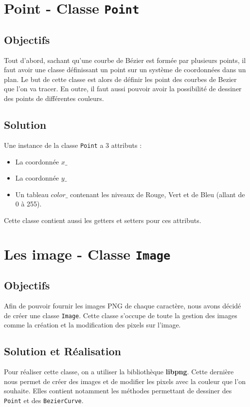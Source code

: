 \documentclass[a4paper, 12pt]{article}
\begin{document}
\newpage
\section{Point - Classe \texttt{Point}}	
\subsection{Objectifs}
	Tout d'abord, sachant qu'une courbe de Bézier est formée par plusieurs points, il faut avoir une classe définissant un point sur un système de coordonnées dans un plan. Le but de cette classe est alors de définir les point des courbes de Bezier que l'on va tracer. En outre, il faut aussi pouvoir avoir la possibilité de dessiner des points de différentes couleurs.
	
\subsection{Solution}
Une instance de la classe \texttt{Point} a 3 attributs : 
\begin{itemize}
\item La coordonnée $x\_$
\item La coordonnée $y\_$
\item Un tableau $color\_$ contenant les niveaux de Rouge, Vert et de Bleu (allant de 0 à 255). 
\end{itemize}
Cette classe contient aussi les getters et setters pour ces attributs.

\section{Les image - Classe \texttt{Image}}	
\subsection{Objectifs}
Afin de pouvoir fournir les images PNG de chaque caractère, nous avons décidé de créer une classe \texttt{Image}. Cette classe s'occupe de toute la gestion des images comme la création et la modification des pixels sur l'image.

\subsection{Solution et Réalisation}
Pour réaliser cette classe, on a utiliser la bibliothèque \textbf{libpng}. Cette dernière nous permet de créer des images et de modifier les pixels avec la couleur que l'on souhaite.
Elles contient notamment les méthodes permettant de dessiner des \texttt{Point} et des \texttt{BezierCurve}.\\
\end{document}
